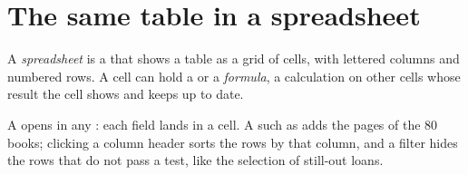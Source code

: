 \section{The same table in a spreadsheet}

\begin{definition}\label{def:g8:files-and-data-tables:spreadsheet}
A \emph{spreadsheet} is a  that shows a table as a
grid of cells, with lettered columns and numbered rows. A cell can hold a
 or a \emph{formula}, a calculation on
other cells whose result the cell shows and keeps up to date.
\end{definition}

A  opens in any  : each field lands in a cell. A
 such as  adds the pages of the 80 books; clicking a
column header sorts the rows by that column, and a filter hides the rows that
do not pass a test, like the selection of still-out loans.

